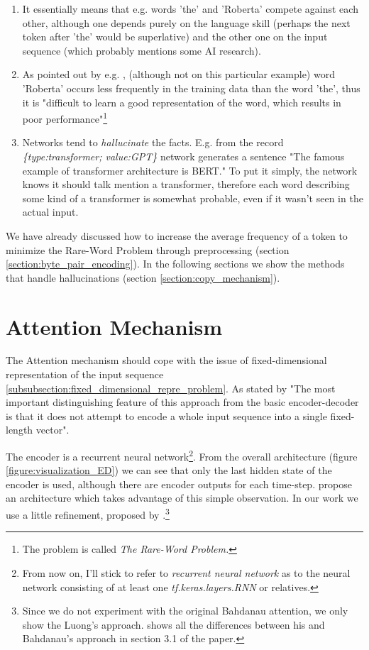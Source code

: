\begin{enumerate}
    \item It essentially means that e.g. words 'the' and 'Roberta' compete against each other, although one depends purely on the language skill (perhaps the next token after 'the' would be superlative) and the other one on the input sequence (which probably mentions some AI research).
    \item As pointed out by e.g. \citep{gulcehre2016pointing}, (although not on this particular example) word 'Roberta' occurs less frequently in the training data than the word 'the', thus it is "difficult to learn a good representation of the word, which results in poor performance"\footnote{The problem is called \emph{The Rare-Word Problem.}}
    \item Networks tend to \emph{hallucinate} the facts. E.g. from the record \emph{\{type:transfor\-mer; value:GPT\}} network generates a sentence "The famous example of transformer architecture is BERT." To put it simply, the network knows it should talk mention a transformer, therefore each word describing some kind of a transformer is somewhat probable, even if it wasn't seen in the actual input.
\end{enumerate}

We have already discussed how to increase the average frequency of a token to minimize the Rare-Word Problem through preprocessing (section \ref{section:byte_pair_encoding}). In the following sections we show the methods that handle hallucinations (section \ref{section:copy_mechanism}).

\section{Attention Mechanism} \label{section:attention_mechanism}

The Attention mechanism should cope with the issue of fixed-dimensional representation of the input sequence \ref{subsubsection:fixed_dimensional_repre_problem}. As stated by \citep{bahdanau2016neural} "The most important distinguishing feature of this approach from the basic encoder-decoder is that it does not attempt to encode a whole input sequence into a single fixed-length vector".

The encoder is a recurrent neural network\footnote{From now on, I'll stick to refer to \emph{recurrent neural network} as to the neural network consisting of at least one \emph{tf.keras.layers.RNN} or relatives.}. From the overall architecture (figure \ref{figure:visualization_ED}) we can see that only the last hidden state of the encoder is used, although there are encoder outputs for each time-step. \citep{bahdanau2016neural} propose an architecture which takes advantage of this simple observation. In our work we use a little refinement, proposed by \citep{luong2015effective}.\footnote{Since we do not experiment with the original Bahdanau attention, we only show the Luong's approach. \citep{luong2015effective} shows all the differences between his and Bahdanau's approach in section 3.1 of the paper.}

